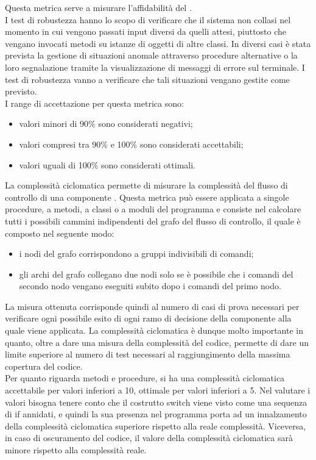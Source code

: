 				 \label{subsec:percTestRobustezza}
					Questa metrica serve a misurare l'affidabilità del .
					\\I test di robustezza hanno lo scopo di verificare che il sistema non collasi nel momento in cui vengono passati input diversi da quelli attesi, piuttosto che vengano invocati metodi su istanze di oggetti di altre classi. In diversi casi è stata prevista la gestione di situazioni anomale attraverso procedure alternative o la loro segnalazione tramite la visualizzazione di messaggi di errore sul terminale. I test di robustezza vanno a verificare che tali situazioni vengano gestite come previsto.
					\\I range di accettazione per questa metrica sono:
					\begin{itemize}
					\item valori minori di 90\% sono considerati negativi;
					\item valori compresi tra 90\% e 100\% sono considerati accettabili;
					\item valori uguali di 100\% sono considerati ottimali.
					\end{itemize}
			 \label{subsec:complCiclomatica}
				La complessità ciclomatica permette di misurare la complessità del flusso di controllo di una componente . Questa metrica può essere applicata a singole procedure, a metodi, a classi o a moduli del programma e consiste nel calcolare tutti i possibili cammini indipendenti del grafo del flusso di controllo, il quale è composto nel seguente modo:
				\begin{itemize}
					\item i nodi del grafo corrispondono a gruppi indivisibili di comandi;
					\item gli archi del grafo collegano due nodi solo se è possibile che i comandi del secondo nodo vengano eseguiti subito dopo i comandi del primo nodo.
				\end{itemize}
				La misura ottenuta corrisponde quindi al numero di casi di prova necessari per verificare ogni possibile esito di ogni ramo di decisione della componente alla quale viene applicata. La complessità ciclomatica è dunque molto importante in quanto, oltre a dare una misura della complessità del codice, permette di dare un limite superiore al numero di test necessari al raggiungimento della massima copertura del codice.\\
				Per quanto riguarda metodi e procedure, si ha una complessità ciclomatica accettabile per valori inferiori a 10, ottimale per valori inferiori a 5. Nel valutare i valori bisogna tenere conto che il costrutto switch viene visto come una sequenza di if annidati, e quindi la sua presenza nel programma porta ad un innalzamento della complessità ciclomatica superiore rispetto alla reale complessità. Viceversa, in caso di oscuramento del codice, il valore della complessità ciclomatica sarà minore rispetto alla complessità reale.
